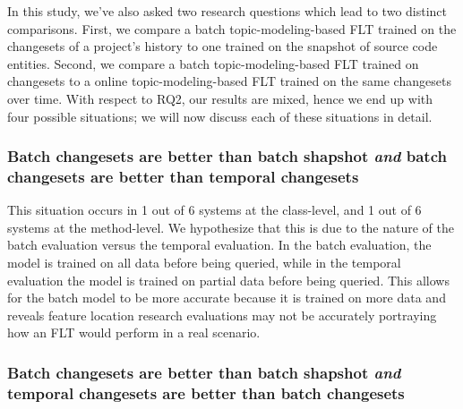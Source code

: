 In this study, we've also asked two research questions which lead to two
distinct comparisons.  First, we compare a batch topic-modeling-based FLT
trained on the changesets of a project's history to one trained on the snapshot
of source code entities.  Second, we compare a batch topic-modeling-based FLT
trained on changesets to a online topic-modeling-based FLT trained on the same
changesets over time.  With respect to RQ2, our results are mixed, hence we end
up with four possible situations; we will now discuss each of these situations
in detail.

%
%
\subsubsection{Batch changesets are better than batch shapshot
\emph{and} batch changesets are better than temporal changesets}

%

This situation occurs in
1 out of 6 systems at the class-level, and
1 out of 6 systems at the method-level.
We hypothesize that this is due to the nature of the batch evaluation versus the temporal evaluation.
In the batch evaluation, the model is trained on all data before being queried,
while in the temporal evaluation the model is trained on partial data before being queried.
This allows for the batch model to be more accurate because it is trained on more data
and reveals feature location research evaluations may not be accurately portraying
how an FLT would perform in a real scenario.

\subsubsection{Batch changesets are better than batch shapshot
\emph{and} temporal changesets are better than batch changesets}

